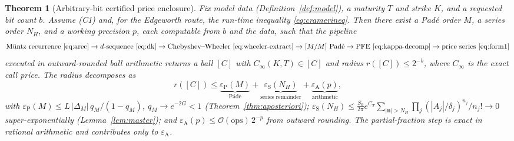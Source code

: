 \documentclass[11pt]{article}
\theoremstyle{plain}
\newtheorem{theorem}{Theorem}[section]
\theoremstyle{definition}
\theoremstyle{remark}
\begin{document}
\begin{theorem}[Arbitrary-bit certified price enclosure]\label{thm:bits}
Fix model data (Definition~\ref{def:model}), a maturity $T$ and strike $K$, and a
requested bit count $b$. Assume \textup{(C1)} and, for the Edgeworth route, the
run-time inequality \eqref{eq:cramerineq}. Then there exist a Padé order $M$, a
series order $N_H$, and a working precision $p$, each computable from $b$ and the
data, such that the pipeline
\[
   \text{M\"untz recurrence \eqref{eq:arec}}\to d\text{-sequence \eqref{eq:dk}}
   \to\text{Chebyshev--Wheeler \eqref{eq:wheeler-extract}}
   \to[M/M]\text{ Padé}\to\text{PFE \eqref{eq:kappa-decomp}}
   \to\text{price series \eqref{eq:form1}}
\]
executed in outward-rounded ball arithmetic returns a ball $[C]$ with
$C_\infty(K,T)\in[C]$ and radius $r([C])\le 2^{-b}$, where $C_\infty$ is the exact
call price. The radius decomposes as
\begin{equation}\label{eq:budget}
   r([C])\le \underbrace{\varepsilon_{\mathrm{P}}(M)}_{\text{P\'ade}}
   +\underbrace{\varepsilon_{\mathrm{S}}(N_H)}_{\text{series remainder}}
   +\underbrace{\varepsilon_{\mathrm{A}}(p)}_{\text{arithmetic}},
\end{equation}
with $\varepsilon_{\mathrm P}(M)\le L\,|\Delta_M|\,q_M/(1-q_M)$, $q_M\to e^{-2G}<1$
(Theorem~\ref{thm:aposteriori}); $\varepsilon_{\mathrm S}(N_H)\le
\frac{S_0}{2\pi}e^{C_T}\!\!\sum_{|\mathbf n|>N_H}\prod_j(|A_j|/\delta_j)^{n_j}/n_j!
\to0$ super-exponentially (Lemma~\ref{lem:master}); and
$\varepsilon_{\mathrm A}(p)\le \mathcal O(\mathrm{ops})\,2^{-p}$ from outward
rounding. The partial-fraction step is exact in rational arithmetic and contributes
only to $\varepsilon_{\mathrm A}$.
\end{theorem}
\end{document}
